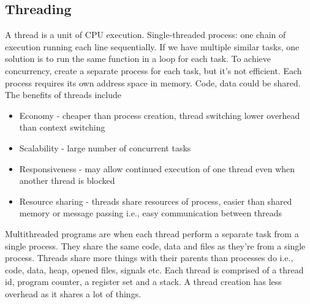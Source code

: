 \documentclass[a4paper]{article}
\theoremstyle{plain}
\theoremstyle{definition}
\newtheorem{defn}{Definition}[section]
\theoremstyle{remark}
\begin{document}
\subsection{Threading}
\begin{tcolorbox}[colback=black!3!white,colframe=black!60!white,title=\begin{defn}Thread \label{Thread}\end{defn}]
A thread is a unit of CPU execution. Single-threaded process: one chain of execution running each line sequentially. If we have multiple similar tasks, one solution is to run the same function in a loop for each task. To achieve concurrency, create a separate process for each task, but it's not efficient. Each process requires its own address space in memory. Code, data could be shared. The benefits of threads include
\begin{itemize}
	\item Economy - cheaper than process creation, thread switching lower overhead than context switching
	\item Scalability - large number of concurrent tasks
	\item Responsiveness - may allow continued execution of one thread even when another thread is blocked
	\item Resource sharing - threads share resources of process, easier than shared memory or message passing i.e., easy communication between threads
\end{itemize}
\end{tcolorbox}
\begin{tcolorbox}[colback=black!3!white,colframe=black!60!white,title=\begin{defn}Multithreading \label{Multithreading}\end{defn}]
Multithreaded programs are when each thread perform a separate task from a single process. They share the same code, data and files as they're from a single process. Threads share more things with their parents than processes do i.e., code, data, heap, opened files, signals etc. Each thread is comprised of a thread id, program counter, a register set and a stack. A thread creation has less overhead as it shares a lot of things.
\end{tcolorbox}
\end{document}
